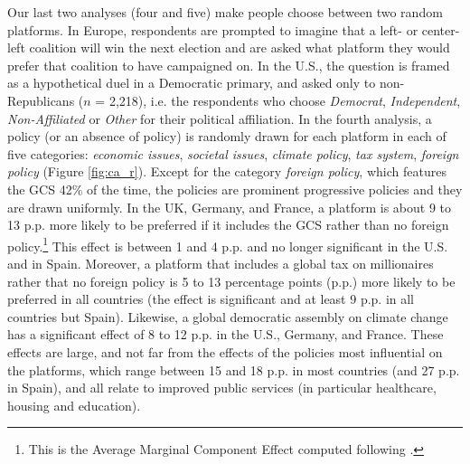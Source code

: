 Our last two analyses (four and five) make people choose between two random platforms. In Europe, respondents are prompted to imagine that a left- or center-left coalition will win the next election and are asked what platform they would prefer that coalition to have campaigned on. In the U.S., the question is framed as a hypothetical duel in a Democratic primary, and asked only to non-Republicans ($n$ = 2,218), i.e. the respondents who choose \textit{Democrat}, \textit{Independent}, \textit{Non-Affiliated} or \textit{Other} for their political affiliation. In the fourth analysis, a policy (or an absence of policy) is randomly drawn for each platform in each of five categories: \textit{economic issues}, \textit{societal issues}, \textit{climate policy}, \textit{tax system}, \textit{foreign policy} (Figure \ref{fig:ca_r}). 
Except for the category \textit{foreign policy}, which features the GCS 42\% of the time, the policies are prominent progressive policies and they are drawn uniformly. %
In the UK, Germany, and France, a platform is about 9 to 13 p.p. more likely to be preferred if it includes the GCS rather than no foreign policy.\footnote{This is the Average Marginal Component Effect computed following \citet{hainmueller_causal_2014}.} This effect is between 1 and 4 p.p. and no longer significant in the U.S. and in Spain. Moreover, a platform that includes a global tax on millionaires rather that no foreign policy is 5 to 13 percentage points (p.p.) more likely to be preferred in all countries (the effect is significant and at least 9 p.p. in all countries but Spain). 
Likewise, a global democratic assembly on climate change has a significant effect of 8 to 12 p.p. in the U.S., Germany, and France. 
These effects are large, and not far from the effects of the policies most influential on the platforms, which range between 15 and 18 p.p. in most countries (and 27 p.p. in Spain), and all relate to improved public services (in particular healthcare, housing and education). 

